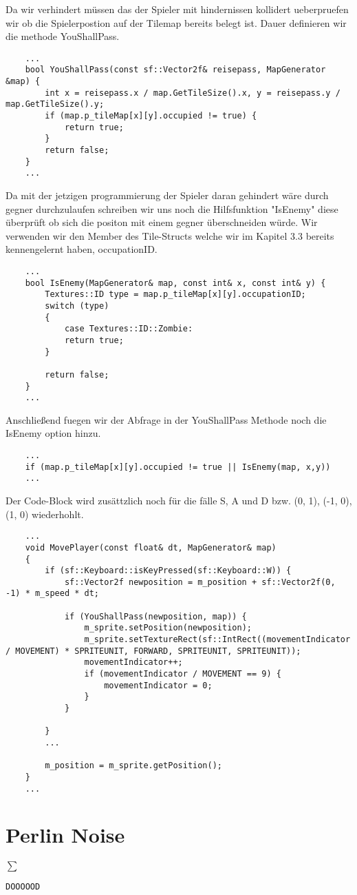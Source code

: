 Da wir verhindert müssen das der Spieler mit hindernissen kollidert ueberpruefen wir ob die Spielerpostion auf der Tilemap bereits belegt ist. Dauer definieren wir die
methode YouShallPass.

\begin{lstlisting}
	...
	bool YouShallPass(const sf::Vector2f& reisepass, MapGenerator &map) {
		int x = reisepass.x / map.GetTileSize().x, y = reisepass.y / map.GetTileSize().y; 
		if (map.p_tileMap[x][y].occupied != true) {
			return true; 
		}
		return false; 
	}
	...
\end{lstlisting}

Da mit der jetzigen programmierung der Spieler daran gehindert wäre durch gegner durchzulaufen schreiben wir uns noch die Hilfsfunktion "IsEnemy" diese überprüft ob sich die positon mit einem gegner überschneiden würde. Wir verwenden wir den Member des Tile-Structs welche wir im Kapitel 3.3 bereits kennengelernt haben, occupationID. 

\begin{lstlisting}
	...
	bool IsEnemy(MapGenerator& map, const int& x, const int& y) {
		Textures::ID type = map.p_tileMap[x][y].occupationID; 
		switch (type)
		{
			case Textures::ID::Zombie:
			return true; 
		}
		
		return false; 
	}
	...
\end{lstlisting}

Anschließend fuegen wir der Abfrage in der YouShallPass Methode noch die IsEnemy option hinzu.

\begin{lstlisting}
	...
    if (map.p_tileMap[x][y].occupied != true || IsEnemy(map, x,y)) 
	...
\end{lstlisting}

Der Code-Block wird zusättzlich noch für die fälle S, A und D bzw. (0, 1), (-1, 0), (1, 0) wiederhohlt.  

\begin{lstlisting}
	...
	void MovePlayer(const float& dt, MapGenerator& map)
	{
		if (sf::Keyboard::isKeyPressed(sf::Keyboard::W)) {
			sf::Vector2f newposition = m_position + sf::Vector2f(0, -1) * m_speed * dt; 
			
			if (YouShallPass(newposition, map)) {
				m_sprite.setPosition(newposition);
				m_sprite.setTextureRect(sf::IntRect((movementIndicator / MOVEMENT) * SPRITEUNIT, FORWARD, SPRITEUNIT, SPRITEUNIT));
				movementIndicator++;
				if (movementIndicator / MOVEMENT == 9) {
					movementIndicator = 0;
				}
			}
			
		}
		...
		
		m_position = m_sprite.getPosition();
	}
	...
\end{lstlisting}



\newpage
\section{Perlin Noise}
$\sum$

\begin{lstlisting}
DOOOOOD
\end{lstlisting}








